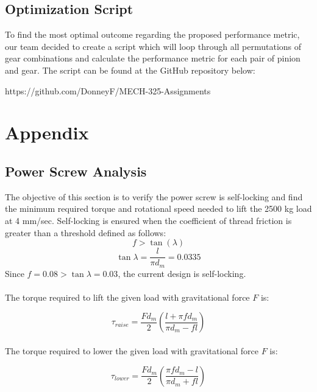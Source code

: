 \documentclass[letterpaper,12pt]{article}
\begin{document}
\subsection{Optimization Script}
To find the most optimal outcome regarding the proposed performance metric, our team decided to create a script which will loop through all permutations of gear combinations and calculate the performance metric for each pair of pinion and gear. The script can be found at the GitHub repository below: \\
\begin{center}
    https://github.com/DonneyF/MECH-325-Assignments
\end{center}

\newpage

\section{Appendix}

\subsection{Power Screw Analysis}

The objective of this section is to verify the power screw is self-locking and find the minimum required torque and rotational speed needed to lift the 2500 kg load at 4 mm/sec.
Self-locking is ensured when the coefficient of thread friction is greater than a threshold defined as follows:
\begin{equation}
f > \tan(\lambda)
\end{equation}
$$\tan\lambda = \frac{l}{\pi d_m} = 0.0335$$
Since $f = 0.08 > \tan\lambda = 0.03$, the current design is self-locking. \\
\\
The torque required to lift the given load with gravitational force $F$ is:

\begin{equation}
\tau_{raise} = \frac{Fd_m}{2}\left(\frac{l+\pi f d_m}{\pi d_m - fl}\right)
\end{equation}
\\
The torque required to lower the given load with gravitational force $F$ is:

\begin{equation}
\tau_{lower} = \frac{Fd_m}{2}\left(\frac{\pi f d_m-l}{\pi d_m + fl}\right)
\end{equation}
\end{document}
